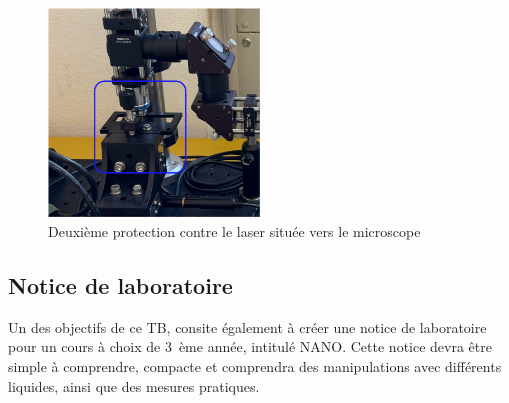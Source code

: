 \begin{figure}[H]
    \begin{center}
        \includegraphics[width=0.5\textwidth]{assets/figures/Introduction/protection_fin_laser.png}
    \end{center}
    \caption{Deuxième protection contre le laser située vers le microscope}
    \label{protection_laser_fin}
\end{figure}

\subsection{Notice de laboratoire}

Un des objectifs de ce TB, consite également à créer une notice de laboratoire pour un cours à choix de 3~ème année, intitulé NANO. Cette notice devra être simple à comprendre, compacte et comprendra des manipulations avec différents liquides, ainsi que des mesures pratiques.



